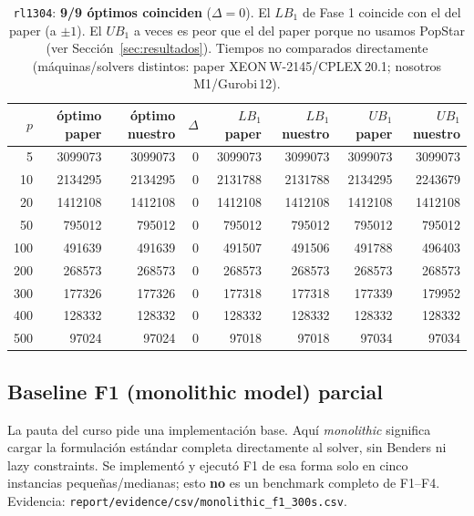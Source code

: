 \begin{table}[h]\centering\small
\begin{tabular}{rrrrrrrr}
\toprule
$p$ & óptimo paper & óptimo nuestro & $\Delta$ & $LB_1$ paper & $LB_1$ nuestro & $UB_1$ paper & $UB_1$ nuestro \\
\midrule
5   & 3099073 & 3099073 & 0 & 3099073 & 3099073 & 3099073 & 3099073 \\
10  & 2134295 & 2134295 & 0 & 2131788 & 2131788 & 2134295 & 2243679 \\
20  & 1412108 & 1412108 & 0 & 1412108 & 1412108 & 1412108 & 1412108 \\
50  &  795012 &  795012 & 0 &  795012 &  795012 &  795012 &  795012 \\
100 &  491639 &  491639 & 0 &  491507 &  491506 &  491788 &  496403 \\
200 &  268573 &  268573 & 0 &  268573 &  268573 &  268573 &  268573 \\
300 &  177326 &  177326 & 0 &  177318 &  177318 &  177339 &  179952 \\
400 &  128332 &  128332 & 0 &  128332 &  128332 &  128332 &  128332 \\
500 &   97024 &   97024 & 0 &   97018 &   97018 &   97034 &   97034 \\
\bottomrule
\end{tabular}
\caption{\texttt{rl1304}: \textbf{9/9 óptimos coinciden} ($\Delta=0$). El $LB_1$ de Fase 1
coincide con el del paper (a $\pm1$). El $UB_1$ a veces es peor que el del paper porque no usamos
PopStar (ver Sección~\ref{sec:resultados}). Tiempos no comparados directamente
(máquinas/solvers distintos: paper XEON\,W-2145/CPLEX\,20.1; nosotros M1/Gurobi\,12).}
\label{tab:paper}
\end{table}

\subsection{Baseline F1 (monolithic model) parcial}
La pauta del curso pide una implementación base. Aquí \emph{monolithic} significa cargar la
formulación estándar completa directamente al solver, sin Benders ni lazy constraints. Se
implementó y ejecutó F1 de esa forma solo en cinco instancias pequeñas/medianas; esto
\textbf{no} es un benchmark completo de F1--F4. Evidencia:
\texttt{report/evidence/csv/monolithic\_f1\_300s.csv}.

